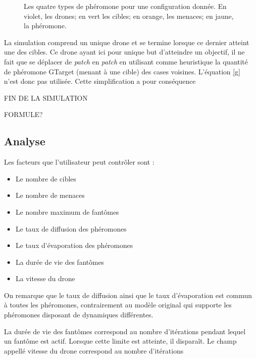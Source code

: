 \documentclass[12pt]{article}
\begin{document}
\begin{figure}[p]
  \caption{Les quatre types de phéromone pour une configuration
    donnée. En violet, les drones; en vert les cibles; en orange, les
    menaces; en jaune, la phéromone.}
  \label{pheromones}
\end{figure}

La simulation comprend un unique drone et se termine lorsque ce
dernier atteint une des cibles. Ce drone ayant ici pour unique but
d'atteindre un objectif, il ne fait que se déplacer de \textit{patch}
en \textit{patch} en utilisant comme heuristique la quantité de
phéromone GTarget (menant à une cible) des cases voisines. L'équation
\ref{g} n'est donc pas utilisée. Cette simplification a pour conséquence



FIN DE LA SIMULATION

FORMULE?

\subsection{Analyse}

Les facteurs que l'utilisateur peut contrôler sont :

\begin{itemize}
\item{Le nombre de cibles}
\item{Le nombre de menaces}
\item{Le nombre maximum de fantômes}
\item{Le taux de diffusion des phéromones}
\item{Le taux d'évaporation des phéromones}
\item{La durée de vie des fantômes}
\item{La vitesse du drone}
\end{itemize}

On remarque que le taux de diffusion ainsi que le taux d'évaporation
est commun à toutes les phéromones, contrairement au modèle original
qui supporte les phéromones disposant de dynamiques différentes.

La durée de vie des fantômes correspond au nombre d'itérations pendant
lequel un fantôme est actif. Lorsque cette limite est atteinte, il
disparaît. Le champ appellé vitesse du drone correspond au nombre
d'itérations



\end{document}

